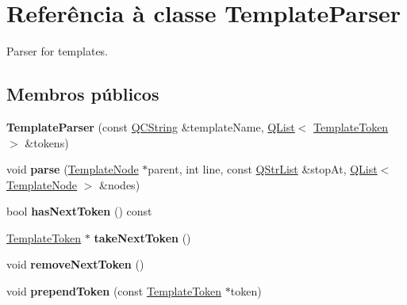 \hypertarget{class_template_parser}{\section{Referência à classe Template\-Parser}
\label{class_template_parser}
}


Parser for templates.  


\subsection*{Membros públicos}
\begin{DoxyCompactItemize}
\item 
\hypertarget{class_template_parser_a3d7b3c3711169cdf69f2835ffd11ee1e}{{\bfseries Template\-Parser} (const \hyperlink{class_q_c_string}{Q\-C\-String} \&template\-Name, \hyperlink{class_q_list}{Q\-List}$<$ \hyperlink{class_template_token}{Template\-Token} $>$ \&tokens)}\label{class_template_parser_a3d7b3c3711169cdf69f2835ffd11ee1e}

\item 
\hypertarget{class_template_parser_a442fa65a1a74b3b2be633cafbbc8358b}{void {\bfseries parse} (\hyperlink{class_template_node}{Template\-Node} $\ast$parent, int line, const \hyperlink{class_q_str_list}{Q\-Str\-List} \&stop\-At, \hyperlink{class_q_list}{Q\-List}$<$ \hyperlink{class_template_node}{Template\-Node} $>$ \&nodes)}\label{class_template_parser_a442fa65a1a74b3b2be633cafbbc8358b}

\item 
\hypertarget{class_template_parser_a55700a8bebacf7ebf569b6b1f924af63}{bool {\bfseries has\-Next\-Token} () const }\label{class_template_parser_a55700a8bebacf7ebf569b6b1f924af63}

\item 
\hypertarget{class_template_parser_a3319aaf8277c6f0660a2156c88096584}{\hyperlink{class_template_token}{Template\-Token} $\ast$ {\bfseries take\-Next\-Token} ()}\label{class_template_parser_a3319aaf8277c6f0660a2156c88096584}

\item 
\hypertarget{class_template_parser_a38654e9a167d68109291cd95df2c338d}{void {\bfseries remove\-Next\-Token} ()}\label{class_template_parser_a38654e9a167d68109291cd95df2c338d}

\item 
\hypertarget{class_template_parser_a9ee8d4b3f074ae8ba70440d1f5957511}{void {\bfseries prepend\-Token} (const \hyperlink{class_template_token}{Template\-Token} $\ast$token)}\label{class_template_parser_a9ee8d4b3f074ae8ba70440d1f5957511}


\end{DoxyCompactItemize}
